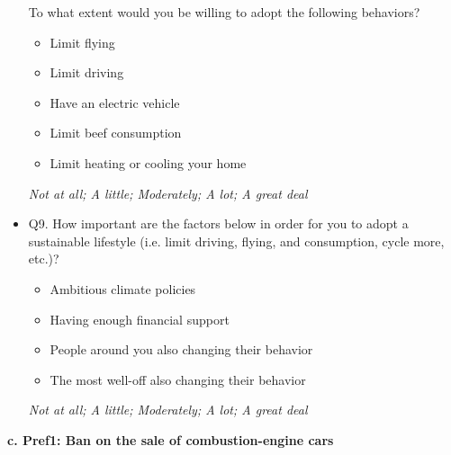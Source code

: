 \documentclass{article}
\begin{document}
\begin{itemize}
    To what extent would you be willing to adopt the following behaviors?
        \begin{itemize}
            \item Limit flying
            \item Limit driving
            \item Have an electric vehicle
            \item Limit beef consumption
            \item Limit heating or cooling your home
        \end{itemize}
    \textit{Not at all; A little; Moderately; A lot; A great deal}
    \item Q9. How important are the factors below in order for you to adopt a sustainable lifestyle (i.e. limit driving, flying, and consumption, cycle more, etc.)?
        \begin{itemize}
            \item Ambitious climate policies
            \item Having enough financial support
            \item People around you also changing their behavior
            \item The most well-off also changing their behavior
        \end{itemize}
    \textit{Not at all; A little; Moderately; A lot; A great deal}
\end{itemize}
\begin{flushleft}
\textbf{c. Pref1: Ban on the sale of combustion-engine cars}
\end{flushleft}
\end{document}
